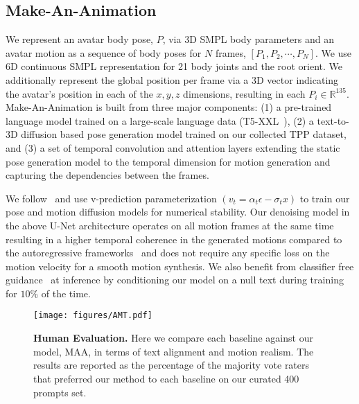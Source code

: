 \documentclass[10pt,twocolumn,letterpaper]{article}
\begin{document}
\subsection{Make-An-Animation}

We represent an avatar body pose, $P$, via 3D SMPL body parameters and an avatar motion as a sequence of body poses for $N$ frames, $[P_1, P_2, \cdots, P_N]$. We use 6D continuous SMPL representation for 21 body joints and the root orient. We additionally represent the global position per frame via a 3D vector indicating the avatar's position in each of the $x, y, z$ dimensions, resulting in each $P_i \in \mathbb{R}^{135} $.  
Make-An-Animation is built from three major components: (1) a pre-trained language model trained on a large-scale language data (T5-XXL~\cite{t5_2020}), (2) a text-to-3D diffusion based pose generation model trained on our collected TPP dataset, and (3) a set of temporal convolution and attention layers extending the static pose generation model to the temporal dimension for motion generation and capturing the dependencies between the frames. 

We follow~\cite{ImagenVid} and use v-prediction parameterization $(v_t = \alpha_t \epsilon -\sigma_t x)$ to train our pose and motion diffusion models for numerical stability. Our denoising model in the above U-Net architecture operates on all motion frames at the same time resulting in a higher temporal coherence in the generated motions compared to the autoregressive frameworks~\cite{tevet2022mdm} and does not require any specific loss on the motion velocity for a smooth motion synthesis.
We also benefit from classifier free guidance~\cite{cfg} at inference by conditioning our model on a null text during training for $10\%$ of the time. 


\begin{figure*}
  \centering \texttt{[image: figures/AMT.pdf]}
  \caption{\textbf{Human Evaluation.} Here we compare each baseline against our model, MAA, in terms of text alignment and motion realism.
The results are reported as the percentage of the majority vote raters that
preferred our method to each baseline on our curated 400 prompts set.} 
  \label{fig:amt}
\end{figure*}
\end{document}
